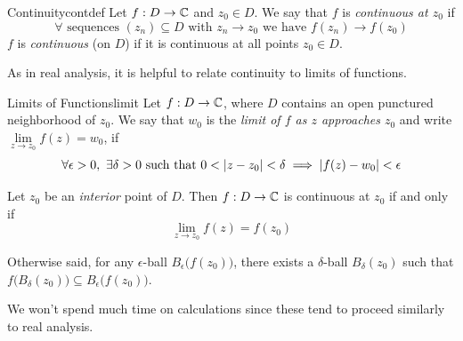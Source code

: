 
\begin{defn}{Continuity}{contdef}
	Let $f:D\to\mathbb{C}$ and $z_0\in D$. We say that $f$ is \emph{continuous at $z_0$} if
	\[
		\forall \text{ sequences } (z_n)\subseteq D\text{ with }z_n\to z_0\text{ we have }f(z_n)\to f(z_0)
	\]
	$f$ is \emph{continuous} (on $D$) if it is continuous at all points $z_0\in D$.
\end{defn}

\goodbreak

As in real analysis, it is helpful to relate continuity to limits of functions.

\begin{defn}{Limits of Functions}{limit}
	Let $f:D\to\mathbb{C}$, where $D$ contains an open punctured neighborhood of $z_0$. We say that $w_0$ is the \emph{limit of $f$ as $z$ approaches $z_0$} and write $\lim\limits_{z\to z_0}f(z)=w_0$, if
	\[
		\forall \epsilon>0,\ \exists \delta>0\text{ such that } 0<\left| z-z_0\right|<\delta\implies \left| f(z)-w_0\right|<\epsilon
	\]
\end{defn}

\begin{thm}{}{}
	Let $z_0$ be an \emph{interior} point of $D$. Then $f:D\to\mathbb{C}$ is continuous at $z_0$ if and only if
	\[
		\lim\limits_{z\to z_0}f(z)=f(z_0)
	\]
\end{thm}

Otherwise said, for any $\epsilon$-ball $B_\epsilon\bigl(f(z_0)\bigr)$, there exists a $\delta$-ball $B_\delta(z_0)$ such that $f\bigl(B_\delta(z_0)\bigr)\subseteq B_\epsilon\bigl(f(z_0)\bigr)$.
\smallbreak


We won't spend much time on calculations since these tend to proceed similarly to real analysis.

